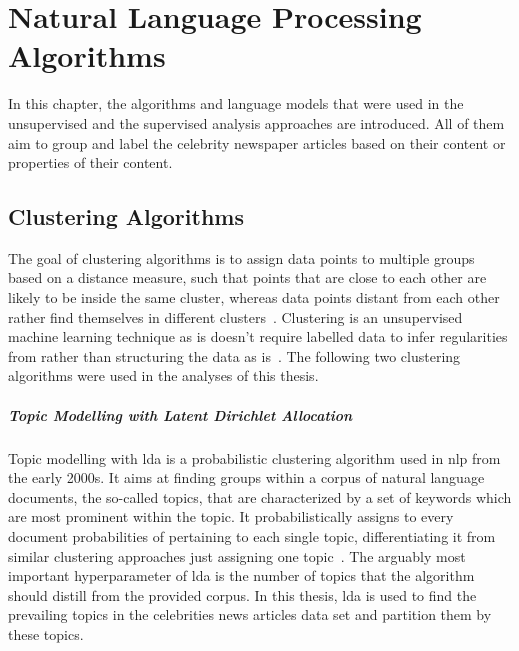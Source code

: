 \renewcommand{\imagepath}{../30-algorithms/img}

\chapter{Natural Language Processing Algorithms}\label{ch:algorithms}
In this chapter, the algorithms and language models that were used in the unsupervised and the supervised analysis approaches are introduced. All of them aim to group and label the celebrity newspaper articles based on their content or properties of their content.




\section{Clustering Algorithms}\label{ch:clustering_algorithms}
The goal of clustering algorithms is to assign data points to multiple groups based on a distance measure, such that points that are close to each other are likely to be inside the same cluster, whereas data points distant from each other rather find themselves in different clusters~\autocite{everitt_cluster_2011,jain_algorithms_1988}. Clustering is an unsupervised machine learning technique as is doesn't require labelled data to infer regularities from rather than structuring the data as is~\autocite{xu_survey_2005}. The following two clustering algorithms were used in the analyses of this thesis.

\paragraph{Topic Modelling with Latent Dirichlet Allocation}\label{ch:lda}
Topic modelling with \gls{lda} is a probabilistic clustering algorithm used in \gls{nlp} from the early 2000s. It aims at finding groups within a corpus of natural language documents, the so-called topics, that are characterized by a set of keywords which are most prominent within the topic. It probabilistically assigns to every document probabilities of pertaining to each single topic, differentiating it from similar clustering approaches just assigning one topic~\autocite{blei_latent_2003, blei_probabilistic_2012}. The arguably most important hyperparameter of \gls{lda} is the number of topics that the algorithm should distill from the provided corpus. In this thesis, \gls{lda} is used to find the prevailing topics in the celebrities news articles data set and partition them by these topics.


